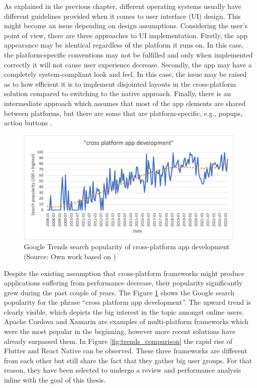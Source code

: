 As explained in the previous chapter, different operating systems usually have different guidelines provided when it comes to user interface (UI) design. This might become an issue depending on design assumptions. Considering the user's point of view, there are three approaches to UI implementation. Firstly, the app appearance may be identical regardless of the platform it runs on. In this case, the platform-specific conventions may not be fulfilled and only when implemented correctly it will not cause user experience decrease. Secondly, the app may have a completely system-compliant look and feel. In this case, the issue may be raised as to how efficient it is to implement disjointed layouts in the cross-platform solution compared to switching to the native approach. Finally, there is an intermediate approach which assumes that most of the app elements are shared between platforms, but there are some that are platform-specific, e.g., popups, action buttons \cite{cross_platform_ux,baseline_cross_platform}.

\begin{figure}[h]
    \centering
    \includegraphics[width=\textwidth]{img/google_trends_cross_platform}
    \caption{Google Trends search popularity of cross-platform app development (Source: Own work based on \cite{trends_cross_platform})}
    \label{fig:trends_cross_platform}
\end{figure}

Despite the existing assumption that cross-platform frameworks might produce applications suffering from performance decrease, their popularity significantly grew during the past couple of years. The Figure \ref{fig:trends_cross_platform} shows the Google search popularity for the phrase ``cross platform app development''. The upward trend is clearly visible, which depicts the big interest in the topic amongst online users. Apache Cordova and Xamarin are examples of multi-platform frameworks which were the most popular in the beginning, however more recent solutions have already surpassed them. In Figure \ref{fig:trends_comparison} the rapid rise of Flutter and React Native can be observed. These three frameworks are different from each other but still share the fact that they gather big user groups. For that reason, they have been selected to undergo a review and performance analysis inline with the goal of this thesis.

